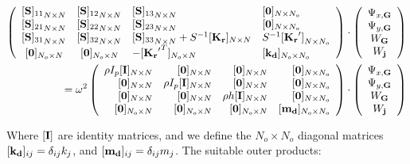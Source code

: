 \documentclass[a4paper]{ICEDyn}
\begin{document}
	\begin{eqnarray}
	\left (
	\begin{array}{l l l l}
	{[{\bf S}]_{11} }_{N\times N}&
	{[{\bf S}]_{12} }_{N\times N} &
	{[{\bf S}]_{13} }_{N\times N} &
	[{\bf 0}]_{N \times N_o} \\
	{[{\bf S}]_{21} }_{N\times N} &
	{[{\bf S}]_{22} }_{N\times N} &
	{[{\bf S}]_{23} }_{N\times N} &
	[{\bf 0}]_{N \times N_o} \\
	{[{\bf S}]_{31} }_{N\times N} &
	{[{\bf S}]_{32} }_{N\times N} & 
      {[{\bf S}]_{33} }_{N\times N} + S^{-1}[{\bf K_r}]_{N\times N} &
	S^{-1}{[{\bf K_r}']}_{N\times N_o}\\
	\ [{\bf 0}]_{N_o \times N} &
	\ [{\bf 0}]_{N_o \times N} &
	-[{{\bf K_r}'}^T]_{N_o\times N} &
	[{\bf k_d}]_{N_o\times N_o}
	\end{array}
	\right ) \cdot
	\left(
	\begin{array}{c}
	\Psi_{x,{\bf G}}\\
	\Psi_{y,{\bf G}}\\
	W_{{\bf G}}\\
	W_{{\bf j}}
	\end{array}
	\right) \nonumber\\
	= \omega^2 \left(
	\begin{array}{r r r r}
	\rho I_p [{\bf I}]_{N\times N}&
	\ [{\bf 0}]_{N \times N}& 
	\ [{\bf 0}]_{N \times N}&
	\ [{\bf 0}]_{N \times N_o}\\
	\ [{\bf 0}]_{N \times N}& 
 	\rho I_p [{\bf I}]_{N\times N} & 
	\ [{\bf 0}]_{N \times N}&
	\ [{\bf 0}]_{N \times N_o}\\
	\ [{\bf 0}]_{N \times N} &  
	\ [{\bf 0}]_{N \times N} &
 	\rho h[{\bf I}]_{N\times N}& 
	\ [{\bf 0}]_{N \times N_o}\\
	\ [{\bf 0}]_{N_o \times N}&
	\ [{\bf 0}]_{N_o \times N}&
	\ [{\bf 0}]_{N_o \times N}&
	[{\bf m_d}]_{N_o \times N_o}
	\end{array}
	\right ) \cdot
	\left(
	\begin{array}{c}
	\Psi_{x,{\bf G}}\\
	\Psi_{y,{\bf G}}\\
	W_{{\bf G}}\\
	W_{{\bf j}}
	\end{array}
	\right)\label{eq:12}
	\end{eqnarray}
	
	Where $[{\bf I}]$ are identity matrices, and we define the ${N_o \times N_o}$ diagonal matrices $[{\bf k_d}]_{ij} =  \delta_{ij} k_j$, and $[{\bf m_d}]_{ij} = \delta_{ij}m_j$. The suitable outer products:
    
\end{document}
